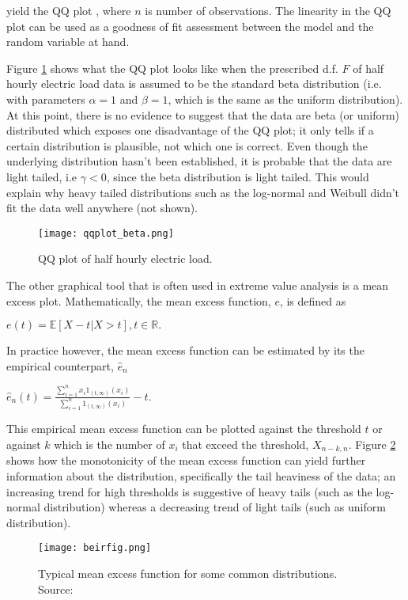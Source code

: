 \noindent yield the QQ plot \citep[ch.~6]{embrechts}, where $n$ is number of observations. The linearity in the QQ plot can be used as a goodness of fit assessment between the model and the random variable at hand.

Figure \ref{fig:beta} shows what the QQ plot looks like when the prescribed d.f. $F$ of half hourly electric load data is assumed to be the standard beta distribution (i.e. with parameters $\alpha=1$ and $\beta=1$, which is the same as the uniform distribution). At this point, there is no evidence to suggest that the data are beta (or uniform) distributed  which exposes one disadvantage of the QQ plot; it only tells if a certain distribution is plausible, not which one is correct. Even though the underlying distribution hasn't been established, it is probable that the data are light tailed, i.e $\gamma < 0$, since the beta distribution is light tailed. This would explain why heavy tailed distributions such as the log-normal and Weibull didn't fit the data well anywhere (not shown). 

\begin{figure}
\centering
\texttt{[image: qqplot\_beta.png]}
\caption{\label{fig:beta} QQ plot of half hourly electric load.}
\end{figure}

The other graphical tool that is often used in extreme value analysis is a mean excess plot. Mathematically, the mean excess function, $e$,  is defined as

\centerline{$e(t) = \mathbb{E}[X-t | X>t], t \in \mathbb{R}.$}
 
In practice however, the mean excess function can be estimated by its the empirical counterpart, $\hat{e}_n$ \citep[ch.~1]{beirlant}

\centerline{$\hat{e}_n(t) = \frac{\sum\limits_{i=1}^n x_i 1_{(t,\infty)}(x_i)}{\sum\limits_{i=1}^n 1_{(t,\infty)}(x_i)} - t.$}

This empirical mean excess function can be plotted against the threshold $t$ or against $k$ which is the number of $x_i$ that exceed the threshold, $X_{n-k,n}$. Figure \ref{fig:beir} shows how the monotonicity of the mean excess function can yield further information about the distribution, specifically the tail heaviness of the data; an increasing trend for high thresholds is suggestive of heavy tails (such as the log-normal distribution) whereas a decreasing trend of light tails (such as uniform distribution).

\begin{figure}
\centering
\texttt{[image: beirfig.png]}
\caption{Typical mean excess function for some common distributions. Source: \cite{beirlant}}
\label{fig:beir} 
\end{figure}

